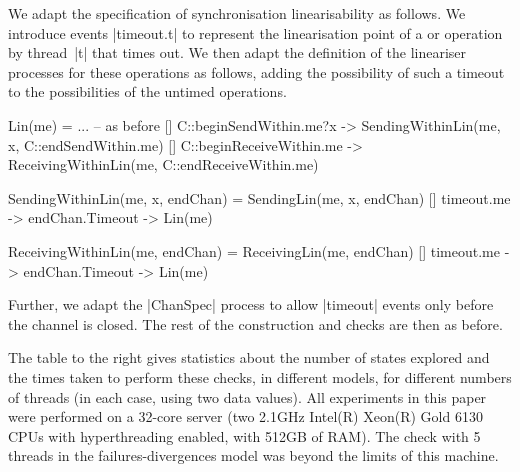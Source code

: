 
\inlineCSP

We adapt the specification of synchronisation linearisability as follows.  We
introduce events |timeout.t| to represent the linearisation point of a
 or  operation by thread~|t| that times
out.  We then adapt the definition of the lineariser processes for these
operations as follows, adding the possibility of such a timeout to the
possibilities of the untimed operations.
%
\begin{cspm}
Lin(me) = 
  ... -- as before
  [] C::beginSendWithin.me?x -> SendingWithinLin(me, x, C::endSendWithin.me)
  [] C::beginReceiveWithin.me -> ReceivingWithinLin(me, C::endReceiveWithin.me)

SendingWithinLin(me, x, endChan) = 
  SendingLin(me, x, endChan)
  [] timeout.me -> endChan.Timeout -> Lin(me)

ReceivingWithinLin(me, endChan) = 
  ReceivingLin(me, endChan) 
  [] timeout.me -> endChan.Timeout -> Lin(me)
\end{cspm}
%
Further, we adapt the |ChanSpec| process to allow |timeout| events only before
the channel is closed.  The rest of the construction and checks are then as
before. 




\begin{window}
%
The table to the right gives statistics about the number of states explored
and the times taken to perform these checks, in different models, for
different numbers of threads (in each case, using two data values).  All
experiments in this paper were performed on a 32-core server (two 2.1GHz
Intel(R) Xeon(R) Gold 6130 CPUs with hyperthreading enabled, with 512GB of
RAM).  The check with 5 threads in the failures-divergences model was beyond
the limits of this machine.
\end{window}

